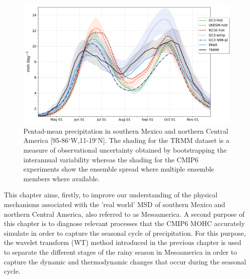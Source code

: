  \begin{figure}[t!]
\includegraphics[width=\linewidth]{figures/seasonal_cycle_p3.png}
\caption[Seasonal cycle of precipitation in Mesoamerica]{Pentad-mean precipitation in southern Mexico and northern Central America [95-86$^\circ$W,11-19$^\circ$N]. The shading for the TRMM dataset is a measure of observational uncertainty obtained by bootstrapping the interannual variability whereas the shading for the CMIP6 experiments show the ensemble spread where multiple ensemble members where available. }
\label{fig:msdcaribb}
\end{figure} 
 

This chapter aims, firstly, to improve our understanding of the physical mechanisms associated with the 'real world' MSD of southern Mexico and northern Central America, also referred to as Mesoamerica. A second purpose of this chapter is to diagnose relevant processes that the CMIP6 MOHC accurately simulate in order to capture the seasonal cycle of precipitation. 
For this purpose, the wavelet transform (WT) method introduced in the previous chapter is used to separate the different stages of the rainy season in Mesoamerica in order to capture the dynamic and thermodynamic changes that occur during the seasonal cycle. 

